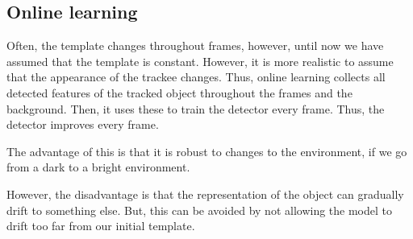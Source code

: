\subsection{Online learning}

Often, the template changes throughout frames, however, until now we have
assumed that the template is constant. However, it is more realistic to
assume that the appearance of the trackee changes. Thus, online learning
collects all detected features of the tracked object throughout the frames
and the background. Then, it uses these to train the detector every frame.
Thus, the detector improves every frame.

The advantage of this is that it is robust to changes to the environment, \eg
if we go from a dark to a bright environment.

However, the disadvantage is that the representation of the object can
gradually drift to something else. But, this can be avoided by not allowing
the model to drift too far from our initial template.
